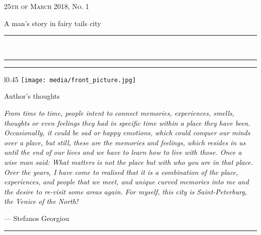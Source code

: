 \documentclass[10pt,a4paper]{article} %
\newcommand{\HorRule}[1]{\noindent\rule{\linewidth}{#1}} %
\newcommand{\SepRule}{\noindent	%
\begin{center}
\rule{250pt}{1pt} %
\end{center}
}
\newcommand{\NewsletterName}[1]{ %
\begin{center}
\Huge \usefont{T1}{fvs}{b}{n} %
#1
\end{center}	
\par \normalsize \normalfont}
\newcommand{\JournalIssue}[1]{ %
\hfill \textsc{25th of March 2018, No. #1} %
\par \normalsize \normalfont}
\newcommand{\NewsItem}[1]{ %
\usefont{T1}{fvs}{n}{n} %
\vspace{24pt}\large #1\vspace{3pt} %
\par \normalsize \normalfont}
\begin{document}
\JournalIssue{1} %

\NewsletterName{A man's story in fairy tails city} %

\noindent\HorRule{3pt} \\[-0.75\baselineskip] %
\HorRule{1pt} %


\vspace{0.5cm}
\SepRule
\vspace{-0.5cm}

\begin{center}
\begin{minipage}[h]{0.75 \linewidth}
\begin{wrapfigure}{l}{0.45 \textwidth}
\texttt{[image: media/front\_picture.jpg]} \\
\end{wrapfigure}
	
\NewsItem{Author's thoughts} %
\vspace{3pt} %
\textit{
From time to time, people intent to connect memories, experiences, smells,
thoughts or even feelings they had in specific time within a place they have been.
Occasionally, it could be sad or happy emotions,
which could conquer our minds over a place,
but still, these are the memories and feelings,
which resides in us until the end of our lives
and we have to learn how to live with those.
Once a wise man said:
What matters is not the place but with who you are in that place.
Over the years, I have come to realised that it is a combination of the place,
experiences, and people that we meet, and unique curved memories into me
and the desire to re-visit some areas again.
For myself, this city is Saint-Peterburg, the Venice of the North!
}
\par\hfill --- Stefanos Georgiou
\end{minipage}
\end{center}

\vspace{0.5cm}
\SepRule %
\vspace{0.5cm}
\end{document}
